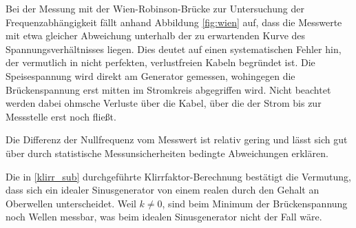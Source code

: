 Bei der Messung mit der Wien-Robinson-Brücke zur Untersuchung der Frequenzabhängigkeit fällt anhand Abbildung \ref{fig:wien} 
auf, dass die Messwerte mit etwa gleicher Abweichung unterhalb der zu erwartenden Kurve des Spannungsverhältnisses liegen. 
Dies deutet auf einen systematischen Fehler hin, der vermutlich in nicht perfekten, verlustfreien Kabeln begründet ist. 
Die Speisespannung wird direkt am Generator gemessen, wohingegen die Brückenspannung erst mitten im Stromkreis abgegriffen 
wird. Nicht beachtet werden dabei ohmsche Verluste über die Kabel, über die der Strom bis zur Messstelle erst noch fließt.

Die Differenz der Nullfrequenz vom Messwert ist relativ gering und lässt sich gut über durch statistische Messunsicherheiten 
bedingte Abweichungen erklären.

Die in \ref{klirr_sub} durchgeführte Klirrfaktor-Berechnung bestätigt die Vermutung, dass sich ein idealer Sinusgenerator 
von einem realen durch den Gehalt an Oberwellen unterscheidet. 
Weil ${k \neq 0}$, sind beim Minimum der Brückenspannung noch Wellen messbar, was beim idealen Sinusgenerator nicht der Fall wäre.
\clearpage
